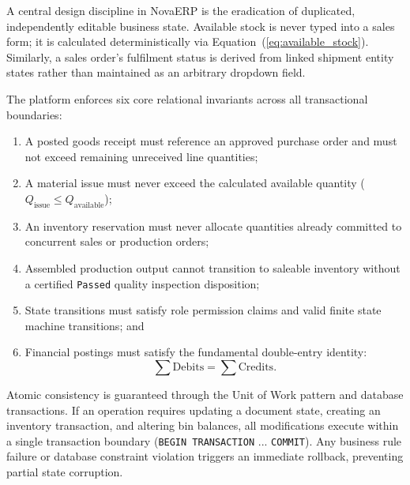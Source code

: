 \documentclass[conference]{IEEEtran}
\begin{document}
A central design discipline in NovaERP is the eradication of duplicated, independently editable business state. Available stock is never typed into a sales form; it is calculated deterministically via Equation~(\ref{eq:available_stock}). Similarly, a sales order's fulfilment status is derived from linked shipment entity states rather than maintained as an arbitrary dropdown field.

The platform enforces six core relational invariants across all transactional boundaries:
\begin{enumerate}
    \item A posted goods receipt must reference an approved purchase order and must not exceed remaining unreceived line quantities;
    \item A material issue must never exceed the calculated available quantity ($Q_{\text{issue}} \le Q_{\text{available}}$);
    \item An inventory reservation must never allocate quantities already committed to concurrent sales or production orders;
    \item Assembled production output cannot transition to saleable inventory without a certified \texttt{Passed} quality inspection disposition;
    \item State transitions must satisfy role permission claims and valid finite state machine transitions; and
    \item Financial postings must satisfy the fundamental double-entry identity:
    \begin{equation}
    \sum \text{Debits} = \sum \text{Credits}.
    \end{equation}
\end{enumerate}

Atomic consistency is guaranteed through the Unit of Work pattern and database transactions. If an operation requires updating a document state, creating an inventory transaction, and altering bin balances, all modifications execute within a single transaction boundary (\texttt{BEGIN TRANSACTION} ... \texttt{COMMIT}). Any business rule failure or database constraint violation triggers an immediate rollback, preventing partial state corruption.
\end{document}
